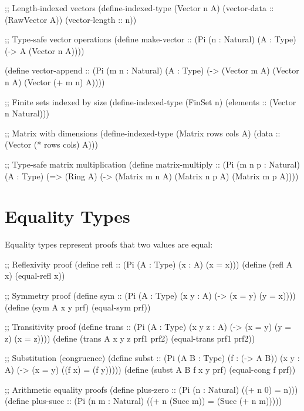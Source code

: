 \begin{example}
\begin{lambdustcode}
;; Length-indexed vectors
(define-indexed-type (Vector n A) 
  (vector-data :: (RawVector A))
  (vector-length :: n))

;; Type-safe vector operations
(define make-vector :: (Pi (n : Natural) (A : Type) (-> A (Vector n A))))

(define vector-append :: (Pi (m n : Natural) (A : Type)
                             (-> (Vector m A) (Vector n A) 
                                 (Vector (+ m n) A))))

;; Finite sets indexed by size  
(define-indexed-type (FinSet n)
  (elements :: (Vector n Natural)))

;; Matrix with dimensions
(define-indexed-type (Matrix rows cols A)
  (data :: (Vector (* rows cols) A)))

;; Type-safe matrix multiplication
(define matrix-multiply :: (Pi (m n p : Natural) (A : Type)
                              (=> (Ring A)
                                  (-> (Matrix m n A) (Matrix n p A) 
                                      (Matrix m p A))))
\end{lambdustcode}
\end{example}

\section{Equality Types}
\label{sec:equality-types}


Equality types represent proofs that two values are equal:

\begin{grammar}
\end{grammar}

\begin{example}
\begin{lambdustcode}
;; Reflexivity proof
(define refl :: (Pi (A : Type) (x : A) (x = x)))
(define (refl A x) (equal-refl x))

;; Symmetry proof  
(define sym :: (Pi (A : Type) (x y : A) (-> (x = y) (y = x))))
(define (sym A x y prf) (equal-sym prf))

;; Transitivity proof
(define trans :: (Pi (A : Type) (x y z : A) 
                     (-> (x = y) (y = z) (x = z))))
(define (trans A x y z prf1 prf2) (equal-trans prf1 prf2))

;; Substitution (congruence)  
(define subst :: (Pi (A B : Type) (f : (-> A B)) (x y : A)
                     (-> (x = y) ((f x) = (f y)))))
(define (subst A B f x y prf) (equal-cong f prf))

;; Arithmetic equality proofs
(define plus-zero :: (Pi (n : Natural) ((+ n 0) = n)))
(define plus-succ :: (Pi (n m : Natural) ((+ n (Succ m)) = (Succ (+ n m)))))
\end{lambdustcode}
\end{example}

